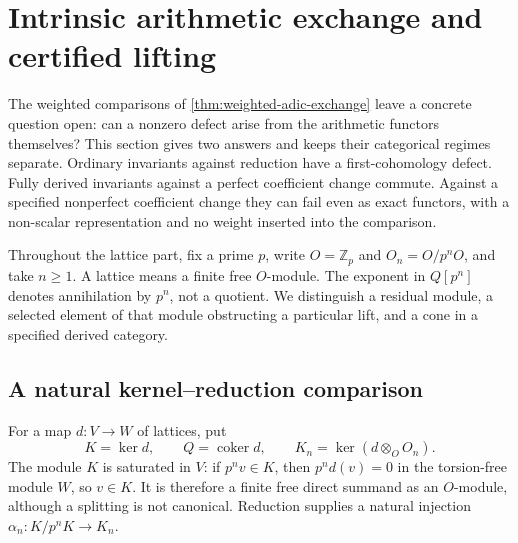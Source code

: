 \section{Intrinsic arithmetic exchange and certified lifting}\label{sec:intrinsic-exchange}

The weighted comparisons of \cref{thm:weighted-adic-exchange} leave a concrete question open: can a nonzero defect arise from the arithmetic functors themselves? This section gives two answers and keeps their categorical regimes separate. Ordinary invariants against reduction have a first-cohomology defect. Fully derived invariants against a perfect coefficient change commute. Against a specified nonperfect coefficient change they can fail even as exact functors, with a non-scalar representation and no weight inserted into the comparison.

Throughout the lattice part, fix a prime $p$, write $O=\mathbb Z_p$ and $O_n=O/p^nO$, and take $n\geq1$. A lattice means a finite free $O$-module. The exponent in $Q[p^n]$ denotes annihilation by $p^n$, not a quotient. We distinguish a residual module, a selected element of that module obstructing a particular lift, and a cone in a specified derived category.

\subsection{A natural kernel--reduction comparison}

For a map $d:V\to W$ of lattices, put
\[
 K=\ker d,\qquad Q=\operatorname{coker}d,\qquad
 K_n=\ker(d\otimes_O O_n).
\]
The module $K$ is saturated in $V$: if $p^n v\in K$, then $p^n d(v)=0$ in the torsion-free module $W$, so $v\in K$. It is therefore a finite free direct summand as an $O$-module, although a splitting is not canonical. Reduction supplies a natural injection $\alpha_n:K/p^nK\to K_n$.

